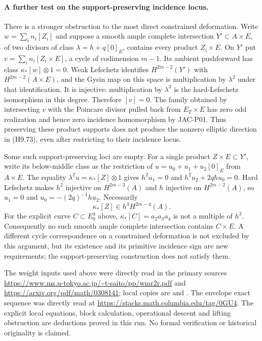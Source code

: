 \documentclass[11pt,a4paper]{article}
\begin{document}
\paragraph{A further test on the support-preserving incidence locus.}
There is a stronger obstruction to the most direct constrained
deformation. Write $w=\sum_i n_i[Z_i]$ and suppose a smooth ample
complete intersection $Y'\subset A\times E$, of two divisors
of class $\lambda=h+q[0]_E$, contains every product $Z_i\times E$.
On $Y'$ put $v=\sum_i n_i[Z_i\times E]$, a cycle of codimension
$m-1$. Its ambient pushforward has class
$\kappa_*[w]\otimes1=0$. Weak Lefschetz identifies
$H^{2m-2}(Y')$ with $H^{2m-2}(A\times E)$, and the Gysin map
on this space is multiplication by $\lambda^2$ under that
identification. It is injective: multiplication by $\lambda^3$
is the hard-Lefschetz isomorphism in this degree. Therefore
$[v]=0$. The family obtained by intersecting $v$ with the
Poincare divisor pulled back from $E_T\times E$ has zero odd
realization and hence zero incidence homomorphism by JAC-P01.
Thus preserving these product supports does not produce the
nonzero elliptic direction in (H9.73), even after restricting to
their incidence locus.

Some such support-preserving loci are empty. For a single product
$Z\times E\subset Y'$, write its below-middle class as the
restriction of $u=u_0+u_1+u_2[0]_E$ from $A\times E$.
The equality $\lambda^2u=\kappa_*[Z]\otimes1$ gives
$h^2u_1=0$ and $h^2u_2+2qh u_0=0$. Hard Lefschetz makes
$h^2$ injective on $H^{2m-3}(A)$ and $h$ injective on
$H^{2m-2}(A)$, so $u_1=0$ and
$u_0=-(2q)^{-1}hu_2$. Necessarily
\[
                     \kappa_*[Z]\in h^3H^{2m-4}(A).
\]
For the explicit curve $C\subset E_0^4$ above,
$\kappa_*[C]=a_2a_3a_4$ is not a multiple of $h^3$.
Consequently no such smooth ample complete intersection contains
$C\times E$. A different cycle correspondence on a constrained
deformation is not excluded by this argument, but its existence
and its primitive incidence sign are new requirements; the
support-preserving construction does not satisfy them.

The weight inputs used above were directly read in the primary
sources
\url{https://www.ms.u-tokyo.ac.jp/~t-saito/pp/wmr2r.pdf} and
\url{https://arxiv.org/pdf/math/0308141}; local copies are
 and
.
The envelope exact sequence was directly read at
\url{https://stacks.math.columbia.edu/tag/0GU4}.
The explicit local equations, block calculation, operational descent
and lifting obstruction are deductions proved in this run.
No formal verification or historical originality is claimed.
\end{document}
